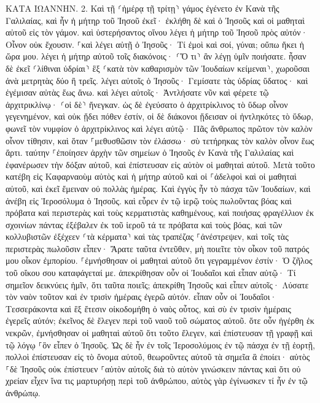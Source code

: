 \documentclass[twoside, 9pt]{extreport}
\begin{document}
ΚΑΤΑ ΙΩΑΝΝΗΝ.
2.
Καὶ τῇ ⸂ἡμέρᾳ τῇ τρίτῃ⸃ γάμος ἐγένετο ἐν Κανὰ τῆς Γαλιλαίας, καὶ ἦν ἡ μήτηρ τοῦ Ἰησοῦ ἐκεῖ· 
ἐκλήθη δὲ καὶ ὁ Ἰησοῦς καὶ οἱ μαθηταὶ αὐτοῦ εἰς τὸν γάμον. 
καὶ ὑστερήσαντος οἴνου λέγει ἡ μήτηρ τοῦ Ἰησοῦ πρὸς αὐτόν· Οἶνον οὐκ ἔχουσιν. 
⸀καὶ λέγει αὐτῇ ὁ Ἰησοῦς· Τί ἐμοὶ καὶ σοί, γύναι; οὔπω ἥκει ἡ ὥρα μου. 
λέγει ἡ μήτηρ αὐτοῦ τοῖς διακόνοις· ⸂Ὅ τι⸃ ἂν λέγῃ ὑμῖν ποιήσατε. 
ἦσαν δὲ ἐκεῖ ⸂λίθιναι ὑδρίαι⸃ ἓξ ⸂κατὰ τὸν καθαρισμὸν τῶν Ἰουδαίων κείμεναι⸃, χωροῦσαι ἀνὰ μετρητὰς δύο ἢ τρεῖς. 
λέγει αὐτοῖς ὁ Ἰησοῦς· Γεμίσατε τὰς ὑδρίας ὕδατος· καὶ ἐγέμισαν αὐτὰς ἕως ἄνω. 
καὶ λέγει αὐτοῖς· Ἀντλήσατε νῦν καὶ φέρετε τῷ ἀρχιτρικλίνῳ· ⸂οἱ δὲ⸃ ἤνεγκαν. 
ὡς δὲ ἐγεύσατο ὁ ἀρχιτρίκλινος τὸ ὕδωρ οἶνον γεγενημένον, καὶ οὐκ ᾔδει πόθεν ἐστίν, οἱ δὲ διάκονοι ᾔδεισαν οἱ ἠντληκότες τὸ ὕδωρ, φωνεῖ τὸν νυμφίον ὁ ἀρχιτρίκλινος 
καὶ λέγει αὐτῷ· Πᾶς ἄνθρωπος πρῶτον τὸν καλὸν οἶνον τίθησιν, καὶ ὅταν ⸀μεθυσθῶσιν τὸν ἐλάσσω· σὺ τετήρηκας τὸν καλὸν οἶνον ἕως ἄρτι. 
ταύτην ⸀ἐποίησεν ἀρχὴν τῶν σημείων ὁ Ἰησοῦς ἐν Κανὰ τῆς Γαλιλαίας καὶ ἐφανέρωσεν τὴν δόξαν αὐτοῦ, καὶ ἐπίστευσαν εἰς αὐτὸν οἱ μαθηταὶ αὐτοῦ. 
Μετὰ τοῦτο κατέβη εἰς Καφαρναοὺμ αὐτὸς καὶ ἡ μήτηρ αὐτοῦ καὶ οἱ ⸀ἀδελφοὶ καὶ οἱ μαθηταὶ αὐτοῦ, καὶ ἐκεῖ ἔμειναν οὐ πολλὰς ἡμέρας. 
Καὶ ἐγγὺς ἦν τὸ πάσχα τῶν Ἰουδαίων, καὶ ἀνέβη εἰς Ἱεροσόλυμα ὁ Ἰησοῦς. 
καὶ εὗρεν ἐν τῷ ἱερῷ τοὺς πωλοῦντας βόας καὶ πρόβατα καὶ περιστερὰς καὶ τοὺς κερματιστὰς καθημένους, 
καὶ ποιήσας φραγέλλιον ἐκ σχοινίων πάντας ἐξέβαλεν ἐκ τοῦ ἱεροῦ τά τε πρόβατα καὶ τοὺς βόας, καὶ τῶν κολλυβιστῶν ἐξέχεεν ⸂τὰ κέρματα⸃ καὶ τὰς τραπέζας ⸀ἀνέστρεψεν, 
καὶ τοῖς τὰς περιστερὰς πωλοῦσιν εἶπεν· Ἄρατε ταῦτα ἐντεῦθεν, μὴ ποιεῖτε τὸν οἶκον τοῦ πατρός μου οἶκον ἐμπορίου. 
⸀ἐμνήσθησαν οἱ μαθηταὶ αὐτοῦ ὅτι γεγραμμένον ἐστίν· Ὁ ζῆλος τοῦ οἴκου σου καταφάγεταί με. 
ἀπεκρίθησαν οὖν οἱ Ἰουδαῖοι καὶ εἶπαν αὐτῷ· Τί σημεῖον δεικνύεις ἡμῖν, ὅτι ταῦτα ποιεῖς; 
ἀπεκρίθη Ἰησοῦς καὶ εἶπεν αὐτοῖς· Λύσατε τὸν ναὸν τοῦτον καὶ ἐν τρισὶν ἡμέραις ἐγερῶ αὐτόν. 
εἶπαν οὖν οἱ Ἰουδαῖοι· Τεσσεράκοντα καὶ ἓξ ἔτεσιν οἰκοδομήθη ὁ ναὸς οὗτος, καὶ σὺ ἐν τρισὶν ἡμέραις ἐγερεῖς αὐτόν; 
ἐκεῖνος δὲ ἔλεγεν περὶ τοῦ ναοῦ τοῦ σώματος αὐτοῦ. 
ὅτε οὖν ἠγέρθη ἐκ νεκρῶν, ἐμνήσθησαν οἱ μαθηταὶ αὐτοῦ ὅτι τοῦτο ἔλεγεν, καὶ ἐπίστευσαν τῇ γραφῇ καὶ τῷ λόγῳ ⸀ὃν εἶπεν ὁ Ἰησοῦς. 
Ὡς δὲ ἦν ἐν τοῖς Ἱεροσολύμοις ἐν τῷ πάσχα ἐν τῇ ἑορτῇ, πολλοὶ ἐπίστευσαν εἰς τὸ ὄνομα αὐτοῦ, θεωροῦντες αὐτοῦ τὰ σημεῖα ἃ ἐποίει· 
αὐτὸς ⸀δὲ Ἰησοῦς οὐκ ἐπίστευεν ⸀αὑτὸν αὐτοῖς διὰ τὸ αὐτὸν γινώσκειν πάντας 
καὶ ὅτι οὐ χρείαν εἶχεν ἵνα τις μαρτυρήσῃ περὶ τοῦ ἀνθρώπου, αὐτὸς γὰρ ἐγίνωσκεν τί ἦν ἐν τῷ ἀνθρώπῳ. 
\end{document}
